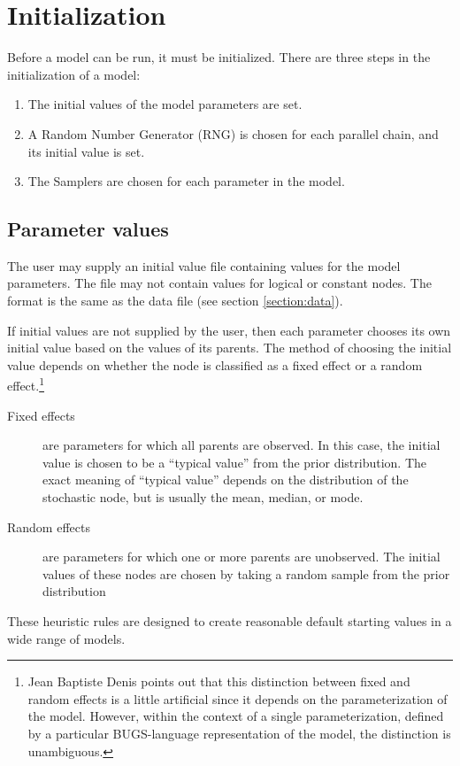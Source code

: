 \documentclass[11pt, a4paper, titlepage]{report}
\begin{document}
\section{Initialization}

Before a model can be run, it must be initialized. There are three
steps in the initialization of a model:
\begin{enumerate}
\item The initial values of the model parameters are set.
\item A Random Number Generator (RNG) is chosen for each parallel chain,
  and its initial value is set.
\item The Samplers are chosen for each parameter in the model. 
\end{enumerate}

\subsection{Parameter values}

The user may supply an initial value file containing values for the
model parameters. The file may not contain values for logical or
constant nodes. The format is the same as the data file (see section
\ref{section:data}).

If initial values are not supplied by the user, then each parameter
chooses its own initial value based on the values of its parents.  The
method of choosing the initial value depends on whether the node is
classified as a fixed effect or a random effect.\footnote{Jean
  Baptiste Denis points out that this distinction between fixed and
  random effects is a little artificial since it depends on the
  parameterization of the model.  However, within the context of a
  single parameterization, defined by a particular BUGS-language
  representation of the model, the distinction is unambiguous.}
\begin{description}
\item[Fixed effects] are parameters for which all parents are
  observed.  In this case, the initial value is chosen to be a
  ``typical value'' from the prior distribution. The exact meaning of
  ``typical value'' depends on the distribution of the stochastic
  node, but is usually the mean, median, or mode.
\item[Random effects] are parameters for which one or more parents are
  unobserved.  The initial values of these nodes are chosen by taking
  a random sample from the prior distribution
\end{description}
These heuristic rules are designed to create reasonable default starting
values in a wide range of models.
\end{document}
